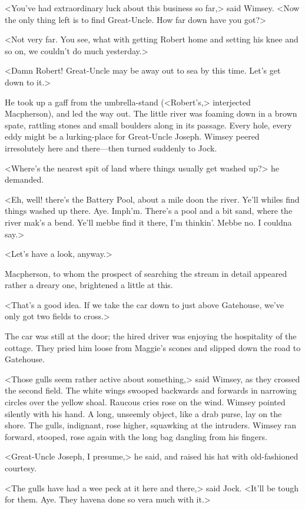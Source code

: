 <You've had extraordinary luck about this business so far,> said Wimsey. <Now the only thing left is to find Great-Uncle. How far down have you got?>

<Not very far. You see, what with getting Robert home and setting his knee and so on, we couldn't do much yesterday.>

<Damn Robert! Great-Uncle may be away out to sea by this time. Let's get down to it.>

He took up a gaff from the umbrella-stand (<Robert's,> interjected Macpherson), and led the way out. The little river was foaming down in a brown spate, rattling stones and small boulders along in its passage. Every hole, every eddy might be a lurking-place for Great-Uncle Joseph. Wimsey peered irresolutely here and there—then turned suddenly to Jock.

<Where's the nearest spit of land where things usually get washed up?> he demanded.

<Eh, well! there's the Battery Pool, about a mile doon the river. Ye'll whiles find things washed up there. Aye. Imph'm. There's a pool and a bit sand, where the river mak's a bend. Ye'll mebbe find it there, I'm thinkin'. Mebbe no. I couldna say.>

<Let's have a look, anyway.>

Macpherson, to whom the prospect of searching the stream in detail appeared rather a dreary one, brightened a little at this.

<That's a good idea. If we take the car down to just above Gatehouse, we've only got two fields to cross.>

The car was still at the door; the hired driver was enjoying the hospitality of the cottage. They pried him loose from Maggie's scones and slipped down the road to Gatehouse.

<Those gulls seem rather active about something,> said Wimsey, as they crossed the second field. The white wings swooped backwards and forwards in narrowing circles over the yellow shoal. Raucous cries rose on the wind. Wimsey pointed silently with his hand. A long, unseemly object, like a drab purse, lay on the shore. The gulls, indignant, rose higher, squawking at the intruders. Wimsey ran forward, stooped, rose again with the long bag dangling from his fingers.

<Great-Uncle Joseph, I presume,> he said, and raised his hat with old-fashioned courtesy.

<The gulls have had a wee peck at it here and there,> said Jock. <It'll be tough for them. Aye. They havena done so vera much with it.>

